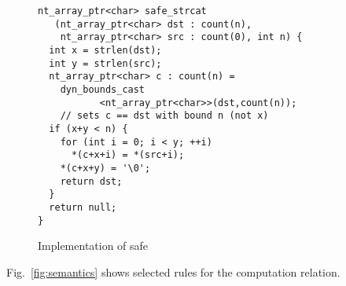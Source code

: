 \begin{figure}[t]
{\small
{\captionsetup[lstlisting]{margin = 8 mm}
  \begin{lstlisting}[xleftmargin=8 mm]
nt_array_ptr<char> safe_strcat
   (nt_array_ptr<char> dst : count(n),
    nt_array_ptr<char> src : count(0), int n) {
  int x = strlen(dst);
  int y = strlen(src);
  nt_array_ptr<char> c : count(n) =
    dyn_bounds_cast
           <nt_array_ptr<char>>(dst,count(n));
    // sets c == dst with bound n (not x)
  if (x+y < n) {
    for (int i = 0; i < y; ++i)
      *(c+x+i) = *(src+i);
    *(c+x+y) = '\0';
    return dst;
  }
  return null;
}
  \end{lstlisting}
}
}
\caption{Implementation of safe }
\label{fig:strcat-ex}
\end{figure}




Fig.~\ref{fig:semantics} shows selected rules for the computation relation.



